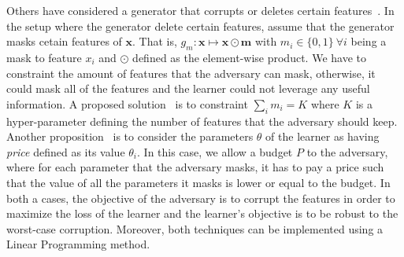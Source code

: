 Others have considered a generator that corrupts or deletes certain features~\cite{Globerson_robust_deletion,dekel_corrupted_learning}. In the setup where the generator delete certain features, assume that the generator masks cetain features of $\bm x$. That is, $g_m:\bm x\mapsto \bm x\odot \bm m$ with $m_i\in\{0,1\}~\forall i$ being a mask to feature $x_i$ and $\odot$ defined as the element-wise product. We have to constraint the amount of features that the adversary can mask, otherwise, it could mask all of the features and the learner could not leverage any useful information. A proposed solution~\cite{Globerson_robust_deletion} is to constraint $\sum_i m_i = K$ where $K$ is a hyper-parameter defining the number of features that the adversary should keep. Another proposition~\cite{dekel_corrupted_learning} is to consider the parameters $\theta$ of the learner as having \textit{price} defined as its value $\theta_i$. In this case, we allow a budget $P$ to the adversary, where for each parameter that the adversary masks, it has to pay a price such that the value of all the parameters it masks is lower or equal to the budget. In both a cases, the objective of the adversary is to corrupt the features in order to maximize the loss of the learner and the learner's objective is to be robust to the worst-case corruption. Moreover, both techniques can be implemented using a Linear Programming method.

